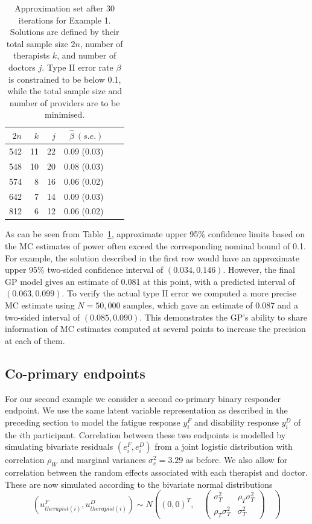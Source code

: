 \documentclass[]{sagej}
\begin{document}
\begin{table}
\caption{Approximation set after 30 iterations for Example 1. Solutions are defined by their total sample size $2n$, number of therapists $k$, and number of doctors $j$. Type II error rate $\beta$ is constrained to be below 0.1, while the total sample size and number of providers are to be minimised.}
\centering
\begin{tabular}{rrrrrr}
\toprule
$2n$ & $k$ & $j$ & $\hat{\beta}~(s.e.)$ \\ 
\midrule
542 & 11 & 22 & 0.09 (0.03) \\ 
548 & 10 & 20 & 0.08 (0.03) \\
574 & 8 & 16 & 0.06 (0.02) \\
642 & 7 & 14 & 0.09 (0.03) \\
812 & 6 & 12 & 0.06 (0.02) \\
\bottomrule
\end{tabular}
\label{tab:ex1_single_run}
\end{table}

As can be seen from Table~\ref{tab:ex1_single_run}, approximate upper 95\% confidence limits based on the MC estimates of power often exceed the corresponding nominal bound of 0.1. For example, the solution described in the first row would have an approximate upper 95\% two-sided confidence interval of $(0.034, 0.146)$. However, the final GP model gives an estimate of 0.081 at this point, with a predicted interval of $(0.063, 0.099)$. To verify the actual type II error we computed a more precise MC estimate using $N = 50,000$ samples, which gave an estimate of 0.087 and a two-sided interval of $(0.085, 0.090)$. This demonstrates the GP's ability to share information of MC estimates computed at several points to increase the precision at each of them.


\subsection{Co-primary endpoints}

For our second example we consider a second co-primary binary responder endpoint. We use the same latent variable representation as described in the preceding section to model the fatigue response $y_i^F$ and disability response $y_i^D$ of the $i$th participant. Correlation between these two endpoints is modelled by simulating bivariate residuals $(e_i^F, e_i^D)$ from a joint logistic distribution with correlation $\rho_W$ and marginal variances $\sigma_e^2 = 3.29$ as before. We also allow for correlation between the random effects associated with each therapist and doctor. These are now simulated according to the bivariate normal distributions
$$
(u_{therapist(i)}^F, u_{therapist(i)}^D) \sim N\left( (0,0)^T, \quad
\begin{pmatrix} 
\sigma_T^2 & \rho_T \sigma_T^2 \\
\rho_T \sigma_T^2  & \sigma_T^2 
\end{pmatrix}
\quad \right)
$$
\end{document}
